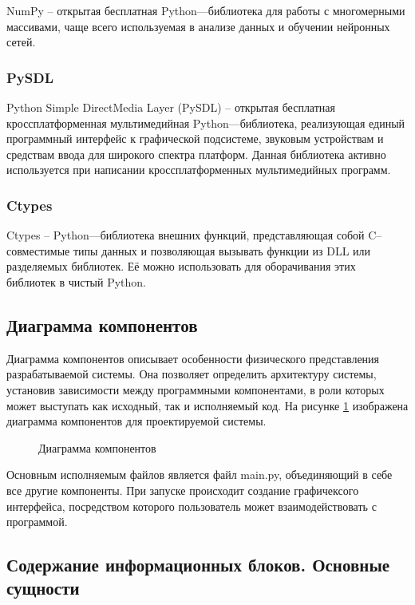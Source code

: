 NumPy -- открытая бесплатная Python—библиотека для работы с многомерными массивами, чаще всего используемая в анализе данных и обучении нейронных сетей.

\subsubsection{PySDL}

Python Simple DirectMedia Layer (PySDL) -- открытая бесплатная кроссплатформенная мультимедийная Python—библиотека, реализующая единый программный интерфейс к графической подсистеме, звуковым устройствам и средствам ввода для широкого спектра платформ. Данная библиотека активно используется при написании кроссплатформенных мультимедийных программ.

\subsubsection{Ctypes}

Ctypes -- Python—библиотека внешних функций, представляющая собой C--совместимые типы данных и позволяющая вызывать функции из DLL или разделяемых библиотек. Её можно использовать для оборачивания этих библиотек в чистый Python.

\subsection{Диаграмма компонентов}

Диаграмма компонентов описывает особенности физического представления разрабатываемой системы. Она позволяет определить архитектуру системы, установив зависимости между программными компонентами, в роли которых может выступать как исходный, так и исполняемый код. На рисунке \ref{diagram_comp:image} изображена диаграмма компонентов для проектируемой системы.

\begin{figure}[ht]
	\caption{Диаграмма компонентов}
	\label{diagram_comp:image}
\end{figure}

Основным исполняемым файлов является файл main.py, объединяющий в себе все другие компоненты. При запуске происходит создание графичексого интерфейса, посредством которого пользователь может взаимодействовать с программой. 

\subsection{Содержание информационных блоков. Основные сущности}

